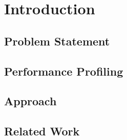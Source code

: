 \chapter{Introduction}\label{ch:introduction}


\section{Problem Statement}\label{sec:problem-statement}


\section{Performance Profiling}\label{sec:performance-profiling}


\section{Approach}\label{sec:approach}


\section{Related Work}\label{sec:related-work}

